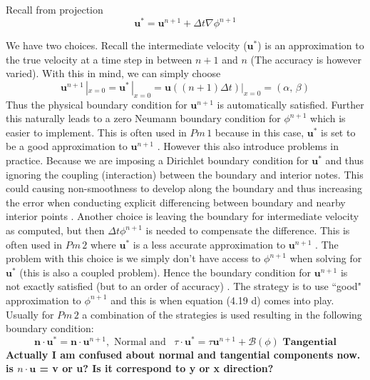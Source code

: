 Recall from projection 
\begin{equation*}
\textbf{u}^* = \textbf{u}^{n+1} + \Delta t \nabla \phi^{n+1}
\end{equation*}

We have two choices. Recall the intermediate velocity ($\textbf{u}^*$) is an approximation to the true velocity at a time step in between $n+1$ and $n$ (The accuracy is however varied). With this in mind, we can simply choose
\begin{equation*}
\textbf{u}^{n+1} \,|_{x = 0} = \textbf{u}^* \,|_{x = 0} = \textbf{u} ((n+1) \Delta t) |_{x=0} = (\alpha, \, \beta)
\end{equation*}
Thus the physical boundary condition for $\textbf{u}^{n+1}$ is automatically satisfied. Further this naturally leads to a zero Neumann boundary condition for $\phi^{n+1}$ which is easier to implement. This is often used in $Pm \,1$ because in this case, $\textbf{u}^*$ is set to be a good approximation to $\textbf{u}^{n+1}$ \cite{brown2001accurate,strikwerda1999accuracy}. However this also introduce problems in practice. Because we are imposing a Dirichlet boundary condition for $\textbf{u}^*$ and thus ignoring the coupling (interaction) between the boundary and interior notes. This could causing non-smoothness to develop along the boundary and thus increasing the error when conducting explicit differencing between boundary and nearby interior points \cite{brown2001accurate}. Another choice is leaving the boundary for intermediate velocity as computed, but then $\Delta t \phi^{n+1}$ is needed to compensate the difference.  This is often used in $Pm\,2$ where $\textbf{u}^*$ is a less accurate approximation to $\textbf{u}^{n+1}$ \cite{kim1985application,brown2001accurate,strikwerda1999accuracy}. The problem with this choice is we simply don't have access to $\phi^{n+1}$ when solving for $\textbf{u}^*$ (this is also a coupled problem). Hence the boundary condition for $\textbf{u}^{n+1}$ is not exactly satisfied (but to an order of accuracy) \cite{strikwerda1999accuracy}. The strategy is to use ``good" approximation to $\phi^{n+1}$ and this is when equation (4.19 d) comes into play. Usually for $Pm\,2$ a combination of the strategies is used resulting in the following boundary condition:
\begin{equation*}
\textbf{n} \cdot \textbf{u}^* = \textbf{n} \cdot \textbf{u}^{n+1}, \text{ Normal and } \, \, \, \textbf{$\tau$} \cdot \textbf{u}^* = \textbf{$\tau$} \textbf{u}^{n+1} + \mathcal{B} (\phi) \textbf{ Tangential}
\end{equation*}
\textbf{Actually I am confused about normal and tangential components now. is $n \cdot \textbf{u}$ = v or u? Is it correspond to y or x direction?}\\

